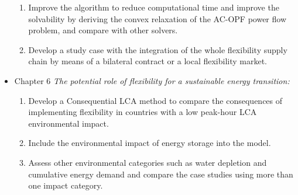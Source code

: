\begin{itemize}
\begin{enumerate}
		\item Improve the algorithm to reduce computational time and improve the solvability by deriving the convex relaxation of the AC-OPF power flow problem, and compare with other solvers. 
		\item Develop a study case with the integration of the whole flexibility supply chain by means of a bilateral contract or a local flexibility market. 
	\end{enumerate}
\item Chapter 6 \textit{The potential role of flexibility for a sustainable energy transition:} 
	\begin{enumerate}
		\item Develop a Consequential LCA method to compare the consequences of implementing flexibility in countries with a low peak-hour LCA environmental impact.
		\item Include the environmental impact of energy storage into the model. 
		\item Assess other environmental categories such as water depletion and cumulative energy demand and compare the case studies using more than one impact category. 
	\end{enumerate}
\end{itemize}
